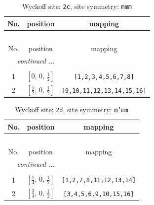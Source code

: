 \documentclass[fleqn,8pt]{jsarticle}
\begin{document}
\renewcommand{\arraystretch}{1.2}
\begin{longtable}{ccc}
\caption{Wyckoff site: {\tt 2c}, site symmetry: {\tt mmm}}
 \\
 \hline \hline
No. & position & mapping \\ \hline \endfirsthead

\multicolumn{2}{l}{\tablename\ \thetable{}} \\
 \hline \hline
No. & position & mapping \\ \hline \endhead

 \hline \hline
\multicolumn{2}{r}{\footnotesize\it continued ...} \\ \endfoot

 \hline \hline
\multicolumn{2}{r}{} \\ \endlastfoot

1 & $\left[ 0,\, 0,\, \frac{1}{2} \right]$ & {\tt [1,2,3,4,5,6,7,8]} \\ \hline
2 & $\left[ \frac{1}{2},\, 0,\, \frac{1}{2} \right]$ & {\tt [9,10,11,12,13,14,15,16]} \\
\end{longtable}
\renewcommand{\arraystretch}{1.2}
\begin{longtable}{ccc}
\caption{Wyckoff site: {\tt 2d}, site symmetry: {\tt m'mm}}
 \\
 \hline \hline
No. & position & mapping \\ \hline \endfirsthead

\multicolumn{2}{l}{\tablename\ \thetable{}} \\
 \hline \hline
No. & position & mapping \\ \hline \endhead

 \hline \hline
\multicolumn{2}{r}{\footnotesize\it continued ...} \\ \endfoot

 \hline \hline
\multicolumn{2}{r}{} \\ \endlastfoot

1 & $\left[ \frac{1}{4},\, 0,\, \frac{1}{2} \right]$ & {\tt [1,2,7,8,11,12,13,14]} \\ \hline
2 & $\left[ \frac{3}{4},\, 0,\, \frac{1}{2} \right]$ & {\tt [3,4,5,6,9,10,15,16]} \\
\end{longtable}
\renewcommand{\arraystretch}{1.2}
\end{document}

